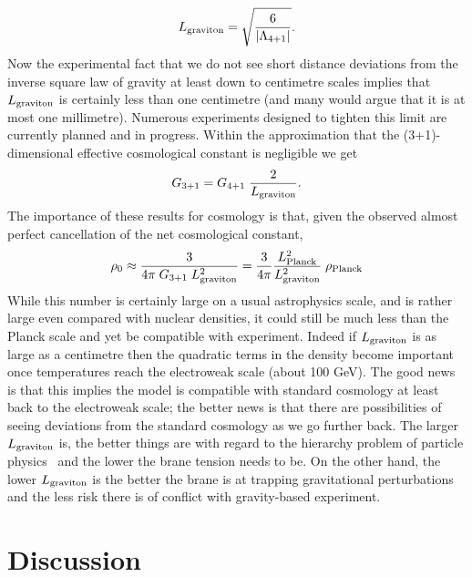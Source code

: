 \documentclass[a4paper,12pt]{article}
\begin{document}
%
\begin{equation}
L_{\mathrm{graviton}} = \sqrt{6\over|\Lambda_{4+1}|}.
\end{equation}
%
Now the experimental fact that we do not see short distance deviations
from the inverse square law of gravity at least down to centimetre
scales implies that $L_{\mathrm{graviton}}$ is certainly less than one
centimetre (and many would argue that it is at most one
millimetre). Numerous experiments designed to tighten this limit are
currently planned and in progress. Within the approximation that the
(3+1)-dimensional effective cosmological constant is negligible we get
%
\begin{equation}
G_{3+1} = G_{4+1} \; {2\over L_{\mathrm{graviton}}}.
\end{equation}
% 
The importance of these results for cosmology is that, given the
observed almost perfect cancellation of the net cosmological constant,
%
\begin{equation}
\rho_0 \approx {3\over4\pi\;G_{3+1}\;L_{\mathrm{graviton}}^2} 
= {3\over4\pi} {L_{\mathrm{Planck}}^2\over L_{\mathrm{graviton}}^2}\; \rho_{\mathrm{Planck}} 
\end{equation}
%
While this number is certainly large on a usual astrophysics scale,
and is rather large even compared with nuclear densities, it could
still be much less than the Planck scale and yet be compatible with
experiment. Indeed if $L_{\mathrm{graviton}}$ is as large as a centimetre then
the quadratic terms in the density become important once temperatures
reach the electroweak scale (about 100 GeV).  The good news is that
this implies the model is compatible with standard cosmology at least
back to the electroweak scale; the better news is that there are
possibilities of seeing deviations from the standard cosmology as we
go further back. The larger $L_{\mathrm{graviton}}$ is, the better things are
with regard to the hierarchy problem of particle physics~\cite{RS1,RS2}
and the lower the brane tension needs to be. On the other hand, the
lower $L_{\mathrm{graviton}}$ is the better the brane is at trapping
gravitational perturbations and the less risk there is of conflict
with gravity-based experiment.

\section{Discussion}
\label{S:discusion}
\end{document}
